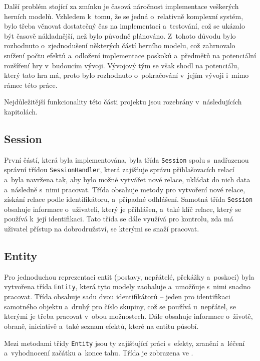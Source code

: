 Další problém stojící za zmínku je časová náročnost implementace veškerých herních modelů. Vzhledem k~tomu, že se jedná o~relativně komplexní systém, bylo třeba věnovat dostatečný čas na implementaci a~testování, což se ukázalo být časově nákladnější, než bylo původně plánováno. Z~tohoto důvodu bylo rozhodnuto o~zjednodušení některých částí herního modelu, což zahrnovalo snížení počtu efektů a~odložení implementace poskoků a~předmětů na potenciální rozšíření hry v~budoucím vývoji. Vývojový tým se však shodl na potenciálu, který tato hra má, proto bylo rozhodnuto o~pokračování v~jejím vývoji i~mimo rámec této práce.

Nejdůležitější funkcionality této části projektu jsou rozebrány v~následujících kapitolách.

\subsection{Session}
\label{subsec:impl_session}

První částí, která byla implementována, byla třída \texttt{Session} spolu s~nadřazenou správní třídou \texttt{SessionHandler}, která zajišťuje správu přihlašovacích relací a~byla navržena tak, aby bylo možné vytvářet nové relace, ukládat do nich data a~následně s~nimi pracovat. Třída obsahuje metody pro vytvoření nové relace, získání relace podle identifikátoru, a~případné odhlášení. Samotná třída \texttt{Session} obsahuje informace o~uživateli, který je přihlášen, a~také klíč relace, který se používá k~její identifikaci. Tato třída se dále využívá pro kontrolu, zda má uživatel přístup na dobrodružství, se kterými se snaží pracovat.

\subsection{Entity}
\label{subsec:impl_entity}

Pro jednoduchou reprezentaci entit (postavy, nepřátelé, překážky a~poskoci) byla vytvořena třída \texttt{Entity}, která tyto modely zaobaluje a~umožňuje s~nimi snadno pracovat. Třída obsahuje sadu dvou identifikátorů -- jeden pro identifikaci samotného objektu a~druhý pro číslo skupiny, což se používá u~nepřátel, se kterými je třeba pracovat v~obou možnostech. Dále obsahuje informace o~životě, obraně, iniciativě a~také seznam efektů, které na entitu působí.

Mezi metodami třídy \texttt{Entity} jsou ty zajišťující práci s~efekty, zranění a~léčení a~vyhodnocení začátku a~konce tahu. Třída je zobrazena ve .

